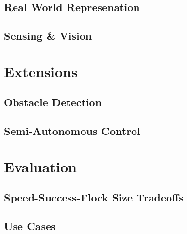 \documentclass{article}
\begin{document}
\subsection{Real World Represenation}

\subsection{Sensing \& Vision}

\section{Extensions}
\subsection{Obstacle Detection}

\subsection{Semi-Autonomous Control}

\section{Evaluation}
\subsection{Speed-Success-Flock Size Tradeoffs}

\subsection{Use Cases}






 
\end{document}
